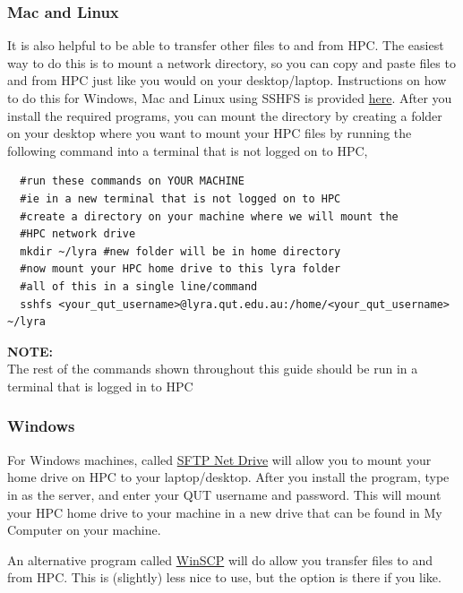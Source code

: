 \subsubsection{Mac and Linux}
It is also helpful to be able to transfer other files to and from HPC. The easiest way to do this is to mount a network directory, so you can copy and paste files to and from HPC just like you would on your desktop/laptop. Instructions on how to do this for Windows, Mac and Linux using SSHFS is provided \href{https://www.digitalocean.com/community/tutorials/how-to-use-sshfs-to-mount-remote-file-systems-over-ssh}{here}. After you install the required programs, you can mount the directory by creating a folder on your desktop where you want to mount your HPC files by running the following command into a terminal that is not logged on to HPC,
%
%
\\
\par
\begin{verbatim}
  #run these commands on YOUR MACHINE
  #ie in a new terminal that is not logged on to HPC
  #create a directory on your machine where we will mount the
  #HPC network drive
  mkdir ~/lyra #new folder will be in home directory
  #now mount your HPC home drive to this lyra folder
  #all of this in a single line/command
  sshfs <your_qut_username>@lyra.qut.edu.au:/home/<your_qut_username> ~/lyra
\end{verbatim}
% 
%
%
\par
\begin{story}
  \textbf{NOTE:}
  \\
  The rest of the commands shown throughout this guide should be run in a terminal that is logged in to HPC
\end{story}
% 
%
\subsubsection{Windows}
For Windows machines, called \href{https://www.nsoftware.com/netdrive/sftp/}{SFTP Net Drive} will allow you to mount your home drive on HPC to your laptop/desktop. After you install the program, type in  as the server, and enter your QUT username and password. This will mount your HPC home drive to your machine in a new drive that can be found in My Computer on your machine.
%
\par
%
An alternative program called \href{https://winscp.net/eng/download.php}{WinSCP} will do allow you transfer files to and from HPC. This is (slightly) less nice to use, but the option is there if you like.

